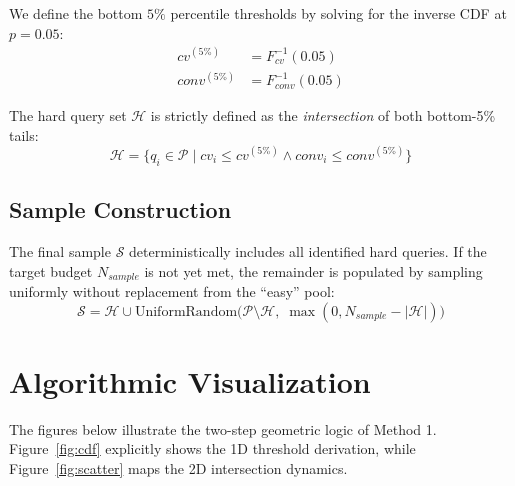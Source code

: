 \documentclass[11pt,a4paper]{article}
\begin{document}
We define the bottom $5\%$ percentile thresholds by solving for the inverse CDF at $p = 0.05$:
\begin{align}
    cv^{(5\%)} &= F_{cv}^{-1}(0.05) \\
    conv^{(5\%)} &= F_{conv}^{-1}(0.05)
\end{align}

The hard query set $\mathcal{H}$ is strictly defined as the \textit{intersection} of both bottom-5\% tails:
\begin{equation}
    \mathcal{H} = \{ q_i \in \mathcal{P} \mid cv_i \leq cv^{(5\%)} \land conv_i \leq conv^{(5\%)} \}
\end{equation}

\subsection{Sample Construction}
The final sample $\mathcal{S}$ deterministically includes all identified hard queries. If the target budget $N_{sample}$ is not yet met, the remainder is populated by sampling uniformly without replacement from the ``easy'' pool:
\begin{equation}
    \mathcal{S} = \mathcal{H} \cup \text{UniformRandom}\Big(\mathcal{P} \setminus \mathcal{H}, \; \max(0, N_{sample} - |\mathcal{H}|)\Big)
\end{equation}

\section{Algorithmic Visualization}

The figures below illustrate the two-step geometric logic of Method 1. Figure~\ref{fig:cdf} explicitly shows the 1D threshold derivation, while Figure~\ref{fig:scatter} maps the 2D intersection dynamics.
\end{document}
